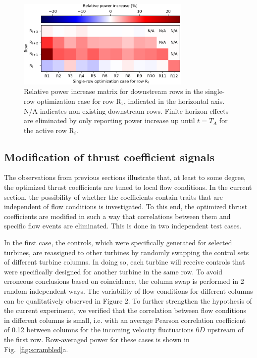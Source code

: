 \documentclass[wes, manuscript]{copernicus}
\newcommand{\revision}[1]{{\color{blue} #1}}
\begin{document}
\begin{figure}
	\centering
	\includegraphics[width=0.75\textwidth]{figure10}
	\caption{Relative power increase matrix for downstream rows in the single-row optimization case for row R$_{\rm i}$, indicated in the horizontal axis. N/A indicates non-existing downstream rows. Finite-horizon effects are eliminated by only reporting power increase up until $t = T_A$ for the active row R$_i$. \label{fig:gains_singlerow}}
\end{figure}

\subsection{Modification of thrust coefficient signals}\label{sec:modified_thrust}
The observations from previous sections illustrate that, at least to some degree, the optimized thrust coefficients are tuned to local flow conditions. In the current section, the possibility of whether the coefficients contain traits that are independent of flow conditions is investigated. To this end, the optimized thrust coefficients are modified in such a way that correlations between them and specific flow events are eliminated. This is done in two independent test cases.

In the first case, the controls, which were specifically generated for selected turbines, are reassigned to other turbines by randomly swapping the control sets of different turbine columns. In doing so, each turbine will receive controls that were specifically designed for another turbine in the same row. To avoid erroneous conclusions based on coincidence, the column swap is performed in 2 random independent ways. \revision{The variability of flow conditions for different columns can be qualitatively observed in Figure 2. To further strengthen the hypothesis of the current experiment, we verified that the  correlation between flow conditions in different columns is small, i.e. with an average Pearson correlation coefficient of 0.12 between columns for the incoming velocity fluctuations 6$D$ upstream of the first row.} Row-averaged power for these cases is shown in Fig.~\ref{fig:scrambled}a. 
\end{document}
